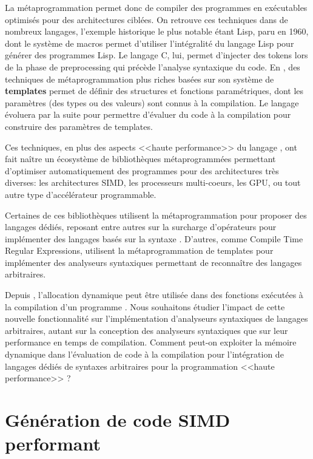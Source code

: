 \documentclass[main]{subfiles}
\begin{document}
La m\'etaprogrammation permet donc de compiler des programmes en ex\'ecutables
optimis\'es pour des architectures cibl\'ees. On retrouve ces techniques
dans de nombreux langages, l'exemple historique le plus notable \'etant
Lisp, paru en 1960, dont le syst\`eme de macros permet d'utiliser
l'int\'egralit\'e du langage Lisp pour g\'en\'erer des programmes Lisp.
Le langage C, lui, permet d'injecter des tokens lors de la phase de
preprocessing qui pr\'ec\`ede l'analyse syntaxique du code. En \cpp,
des techniques de m\'etaprogrammation plus riches bas\'ees sur son syst\`eme de
\textbf{templates} permet de d\'efinir des structures et fonctions
param\'etriques, dont les param\`etres (des types ou des valeurs) sont
connus \`a la compilation. Le langage \'evoluera par la suite pour permettre
d'\'evaluer du code \cpp \`a la compilation pour construire des param\`etres de
templates.

Ces techniques, en plus des aspects <<haute performance>> du langage \cpp,
ont fait na\^itre un \'ecosyst\`eme de biblioth\`eques m\'etaprogramm\'ees
permettant d'optimiser automatiquement des programmes pour des architectures
tr\`es diverses: les architectures SIMD, les processeurs multi-coeurs, les GPU,
ou tout autre type d'acc\'el\'erateur programmable.

Certaines de ces biblioth\`eques utilisent la m\'etaprogrammation pour proposer
des langages d\'edi\'es, reposant entre autres sur la surcharge
d'op\'erateurs pour impl\'ementer des langages bas\'es sur la syntaxe \cpp.
D'autres, comme Compile Time Regular Expressions, utilisent
la m\'etaprogrammation de templates pour impl\'ementer des analyseurs
syntaxiques permettant de reconna\^itre des langages arbitraires.

Depuis , l'allocation dynamique peut \^etre utilis\'ee dans des fonctions
ex\'ecut\'ees \`a la compilation d'un programme \cpp. Nous souhaitons \'etudier
l'impact de cette nouvelle fonctionnalit\'e sur l'impl\'ementation d'analyseurs
syntaxiques de langages arbitraires, autant sur la conception des analyseurs
syntaxiques que sur leur performance en temps de compilation.
Comment peut-on exploiter la m\'emoire dynamique dans l'\'evaluation de code
\cpp \`a la compilation pour l'int\'egration de langages d\'edi\'es de syntaxes
arbitraires pour la programmation <<haute performance>> ?

\section{
  G\'en\'eration de code SIMD performant
}
\end{document}
